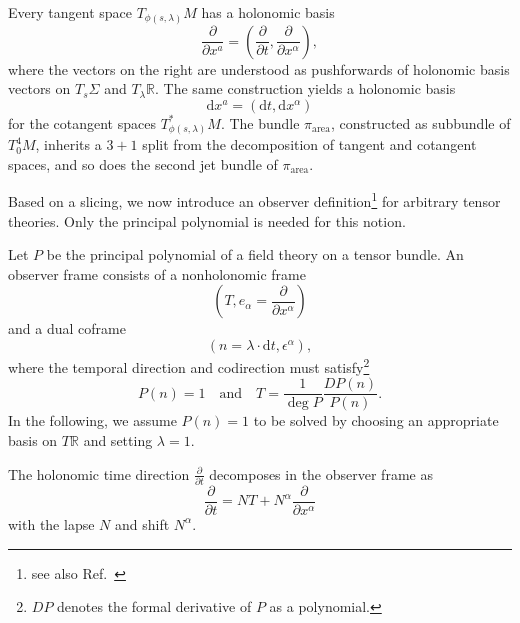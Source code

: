 Every tangent space $T_{\phi(s,\lambda)}M$ has a holonomic basis
\begin{equation}
  \frac{\partial}{\partial x^a} = \left( \frac{\partial}{\partial t},\frac{\partial}{\partial x^\alpha}\right),
\end{equation}
where the vectors on the right are understood as pushforwards of holonomic basis vectors on $T_s\Sigma$ and $T_\lambda\mathbb R$. The same construction yields a holonomic basis
\begin{equation}
  \mathrm dx^a = (\mathrm dt, \mathrm dx^\alpha)
\end{equation}
for the cotangent spaces $T_{\phi(s,\lambda)}^\ast M$. The bundle $\pi_\text{area}$, constructed as subbundle of $T^4_0M$, inherits a $3+1$ split from the decomposition of tangent and cotangent spaces, and so does the second jet bundle of $\pi_\text{area}$.

Based on a slicing, we now introduce an observer definition\footnote{see also Ref.~\cite{Giesel_2012}} for arbitrary tensor theories. Only the principal polynomial is needed for this notion.
\begin{definition}
  Let $P$ be the principal polynomial of a field theory on a tensor bundle. An observer frame consists of a nonholonomic frame
  \begin{equation}
    (T, e_\alpha = \frac{\partial}{\partial x^\alpha})
  \end{equation}
  and a dual coframe
  \begin{equation}
    (n = \lambda\cdot \mathrm dt, \epsilon^{\alpha}),
  \end{equation}
  where the temporal direction and codirection must satisfy\footnote{$DP$ denotes the formal derivative of $P$ as a polynomial.}
  \begin{equation}\label{frame_conditions}
    P(n) = 1\quad\text{and}\quad T=\frac{1}{\operatorname{deg}P}\frac{DP(n)}{P(n)}.
  \end{equation}
  In the following, we assume $P(n) = 1$ to be solved by choosing an appropriate basis on $T\mathbb R$ and setting $\lambda = 1$.

  The holonomic time direction $\frac{\partial}{\partial t}$ decomposes in the observer frame as
  \begin{equation}
    \frac{\partial}{\partial t} = NT + N^\alpha \frac{\partial}{\partial x^\alpha}
  \end{equation}
  with the lapse $N$ and shift $N^\alpha$.
\end{definition}

